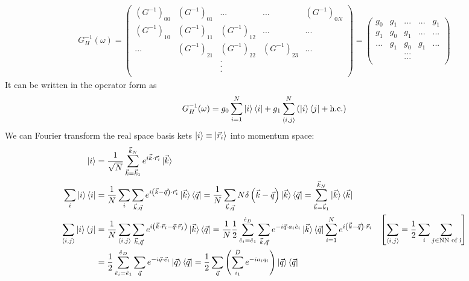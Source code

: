 \documentclass[12pt]{article}
\numberwithin{equation}{section}
\begin{document}
\begin{equation}\begin{aligned}
	G^{-1}_H(\omega) = \begin{pmatrix} \left(G^{-1}\right)_{00} & \left(G^{-1}\right)_{01} & ... & ... & \left(G^{-1}\right)_{0N}\\
		\left(G^{-1}\right)_{10} & \left(G^{-1}\right)_{11} & \left(G^{-1}\right)_{12} & ... & ...\\
		... & \left(G^{-1}\right)_{21} & \left(G^{-1}\right)_{22} & \left(G^{-1}\right)_{23} & ... \\
		    &&.&&\\
		    &&.&&\\
		    &&.&&\\
\end{pmatrix} = \begin{pmatrix} g_0 & g_1 & ... & ... & g_1\\
		g_1 & g_0 & g_1 & ... & ...\\
		... & g_1 & g_0 & g_1 & ... \\
		    &&...&&\\
		    &&...&&\\
\end{pmatrix} 
\end{aligned}\end{equation}
It can be written in the operator form as
\begin{equation}\begin{aligned}
	G_H^{-1}(\omega) = g_0\sum_{i=1}^N\ket{i}\bra{i} + g_1\sum_{\left<i,j \right>}^N\left( \ket{i}\bra{j} + \text{h.c.}\right)
\end{aligned}\end{equation}
We can Fourier transform the real space basis kets $\ket{i} \equiv \ket{\vec r_i}$ into momentum space:
\begin{equation}\begin{aligned}
	\ket{i} &= \frac{1}{\sqrt N}\sum_{\vec k=\vec k_1}^{\vec k_N} e^{i \vec{k}\cdot\vec{r_i}}\ket{\vec k}\\
	\sum_i \ket{i}\bra{i} &= \frac{1}{N}\sum_i \sum_{\vec k, \vec q} e^{i \left(\vec{k} - \vec q\right)\cdot\vec{r_i}}\ket{\vec k}\bra{\vec q} = \frac{1}{N}\sum_{\vec k, \vec q} N \delta\left(\vec{k} - \vec q\right)\ket{\vec k}\bra{\vec q} = \sum_{\vec k=\vec k_1}^{\vec k_N} \ket{\vec k}\bra{\vec k}\\
	\sum_{\left<i,j \right>} \ket{i}\bra{j} &= \frac{1}{N}\sum_{\left<i,j \right>} \sum_{\vec k, \vec q} e^{i \left(\vec{k}\cdot \vec r_i - \vec q\cdot \vec r_j\right)}\ket{\vec k}\bra{\vec q} = \frac{1}{N}\frac{1}{2}\sum_{\hat e_i = \hat e_1}^{\hat e_D}\sum_{\vec k, \vec q} e^{-i\vec q\cdot a_i\hat e_i}\ket{\vec k}\bra{\vec q}\sum_{i=1}^N e^{i \left(\vec{k} - \vec q\right)\cdot \vec r_i} & \left[\sum_{\left<i,j \right>} = \frac{1}{2}\sum_i \sum_{j \in \text{NN of i}}\right] \\
					&=\frac{1}{2}\sum_{\hat e_i = \hat e_1}^{\hat e_D}\sum_{\vec q} e^{-i\vec q\cdot \vec e_i}\ket{\vec q}\bra{\vec q} = \frac{1}{2}\sum_{\vec q} \left(\sum_{i_1}^{D}e^{-ia_iq_i}\right)\ket{\vec q}\bra{\vec q}
\end{aligned}\end{equation}
\end{document}
